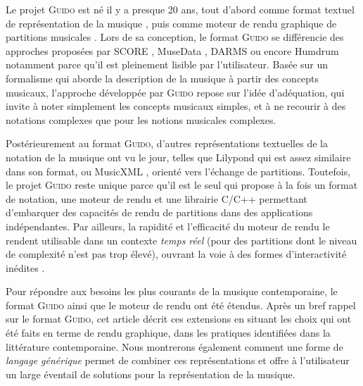 \documentclass{article}
\newcommand{\guido}			{\textsc{Guido}}
\begin{document}
Le projet \guido{} est né il y a presque 20 ans, tout d'abord comme format textuel de représentation de la musique \cite{hoos98,guido}, puis comme moteur de rendu graphique de partitions musicales \cite{RENZ02}. 
Lors de sa conception, le format \guido{} se différencie des approches proposées par SCORE \cite{SCORE}, MuseData \cite{Hewlett97}, DARMS \cite{darms} ou encore Humdrum \cite{Huron97} notamment parce qu'il est pleinement lisible par l'utilisateur. Basée sur un formalisme qui aborde la description de la musique à partir des concepts musicaux, l'approche développée par \guido{} repose sur l'idée d'adéquation, qui invite à noter simplement les concepts musicaux simples, et à ne recourir à des notations complexes que pour les notions musicales complexes.

Postérieurement au format \guido{}, d'autres représentations textuelles de la notation de la musique ont vu le jour, telles que Lilypond \cite{lilypond03,lilypond06} qui est assez similaire dans son format, ou MusicXML \cite{good01}, orienté vers l'échange de partitions. Toutefois, le projet \guido{} reste unique parce qu'il est le seul qui propose à la fois un format de notation, une moteur de rendu et une librairie C/C++ permettant d'embarquer des capacités de rendu de partitions dans des applications indépendantes.
Par ailleurs, la rapidité et l'efficacité du moteur de rendu le rendent utilisable dans un contexte \textit{temps réel} (pour des partitions dont le niveau de complexité n'est pas trop élevé), ouvrant la voie à des formes d'interactivité inédites \cite{Hoadley12,Fober:12a}.

Pour répondre aux besoins les plus courants de la musique contemporaine, le format \guido{} ainsi que le moteur de rendu ont été étendus. Après un bref rappel sur le format \guido{}, cet article décrit ces extensions en  situant les choix qui ont été faits en terme de rendu graphique, dans les pratiques identifiées dans la littérature contemporaine. Nous montrerons également comment une forme de \emph{langage générique} permet de combiner ces représentations et offre à l'utilisateur un large éventail de solutions pour la représentation de la musique.
\end{document}
